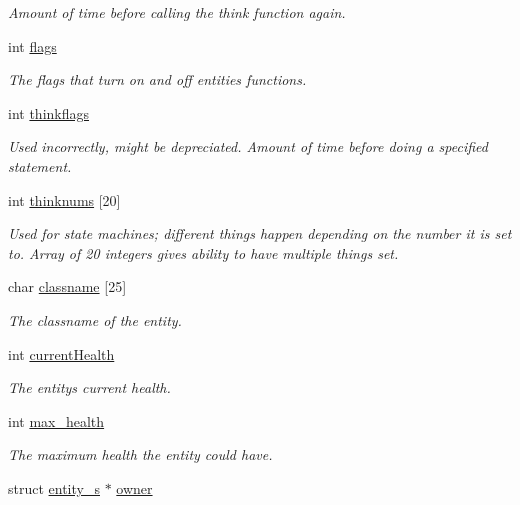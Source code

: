 \begin{DoxyCompactItemize}
\begin{DoxyCompactList}\small\item\em Amount of time before calling the think function again. \end{DoxyCompactList}\item 
int \hyperlink{structentity__s_ac8bf36fe0577cba66bccda3a6f7e80a4}{flags}
\begin{DoxyCompactList}\small\item\em The flags that turn on and off entities\textquotesingle{} functions. \end{DoxyCompactList}\item 
int \hyperlink{structentity__s_a7cb2b75bb66761caa1cfd378e8c4d206}{thinkflags}
\begin{DoxyCompactList}\small\item\em Used incorrectly, might be depreciated. Amount of time before doing a specified statement. \end{DoxyCompactList}\item 
int \hyperlink{structentity__s_a3688a13a7bb7a088e86bc07f1c0502b8}{thinknums} \mbox{[}20\mbox{]}
\begin{DoxyCompactList}\small\item\em Used for state machines; different things happen depending on the number it is set to. Array of 20 integers gives ability to have multiple things set. \end{DoxyCompactList}\item 
char \hyperlink{structentity__s_a810ee4074f3b71c09214fd9cfafcc922}{classname} \mbox{[}25\mbox{]}
\begin{DoxyCompactList}\small\item\em The classname of the entity. \end{DoxyCompactList}\item 
int \hyperlink{structentity__s_af8c04013cfb0444c405822e9939d8ae6}{current\+Health}
\begin{DoxyCompactList}\small\item\em The entity\textquotesingle{}s current health. \end{DoxyCompactList}\item 
int \hyperlink{structentity__s_ae7fb049f4b5173a202e774b3eb3e64e4}{max\+\_\+health}
\begin{DoxyCompactList}\small\item\em The maximum health the entity could have. \end{DoxyCompactList}\item 
struct \hyperlink{structentity__s}{entity\+\_\+s} $\ast$ \hyperlink{structentity__s_ab185065de2325558e780597d0e51230f}{owner}

\end{DoxyCompactItemize}
